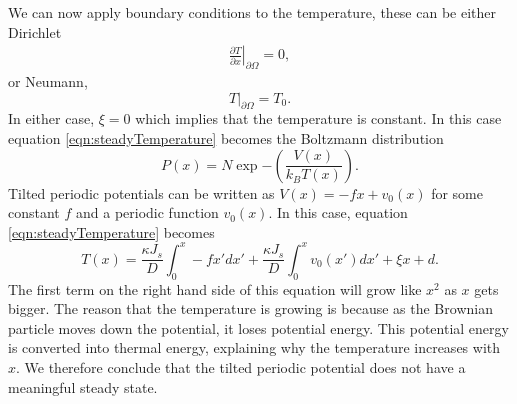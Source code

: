 We can now apply boundary conditions to the temperature, these can be either Dirichlet
\begin{eqnarray}
\left.\frac{\partial T}{\partial x}\right\rvert_{\partial \Omega} = 0,
\end{eqnarray}
or Neumann,
\begin{equation}
T \rvert_{\partial \Omega} = T_0.
\end{equation}
In either case, $\xi = 0$ which implies that the temperature is constant. In this case equation \ref{eqn:steadyTemperature} becomes the Boltzmann distribution
\begin{equation}
P(x) = N \exp{-\left (\frac{V(x)}{k_B T(x)} \right)}.
\end{equation}
Tilted periodic potentials can be written as $V(x) = -f x + v_0(x)$ for some constant $f$ and a periodic function $v_0(x)$. In this case, equation \ref{eqn:steadyTemperature} becomes
\begin{equation}
T(x) = \frac{\kappa J_s}{D} \int_0^x -f x' dx' + \frac{\kappa J_s}{D} \int_0^x v_0(x') dx' + \xi x + d.
\end{equation}
The first term on the right hand side of this equation will grow like $x^2$ as $x$ gets bigger. The reason that the temperature is growing is because as the Brownian particle moves down the potential, it loses potential energy. This potential energy is converted into thermal energy, explaining why the temperature increases with $x$. We therefore conclude that the tilted periodic potential does not have a meaningful steady state.
